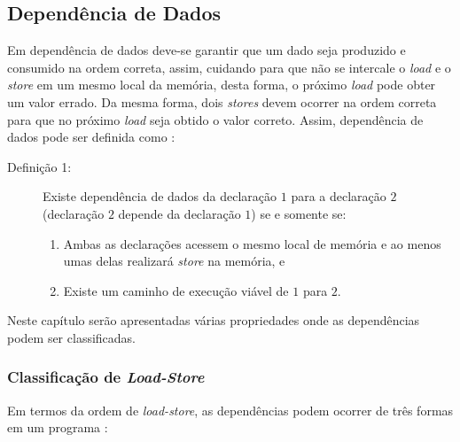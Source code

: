\subsection{Dependência de Dados}

Em dependência de dados deve-se garantir que um dado seja produzido e consumido
na ordem correta, assim, cuidando para que não se intercale o \textit{load} e o
\textit{store} em um mesmo local da memória, desta forma, o próximo
\textit{load} pode obter um valor errado. 
Da mesma forma, dois \textit{stores} devem ocorrer na ordem correta para 
que no próximo \textit{load} seja obtido o valor correto.
Assim, dependência de dados pode ser definida como \cite[2.2]{ocfma}:

\begin{description}
        \item [Definição 1:] Existe dependência de dados da declaração $1$ para a declaração 
        $2$ (declaração $2$ depende da declaração $1$) se e somente se:
\begin{enumerate}
        \item Ambas as declarações acessem o mesmo local de memória e ao menos
                umas delas realizará \textit{store} na memória, e
        \item Existe um caminho de execução viável de $1$ para $2$.
\end{enumerate}
\end{description}

Neste capítulo serão apresentadas várias propriedades onde as dependências 
podem ser classificadas.


\subsubsection{Classificação de \textit{Load-Store}}

Em termos da ordem de \textit{load-store}, as dependências podem ocorrer de 
três formas em um programa \cite{Chang:2004}:


